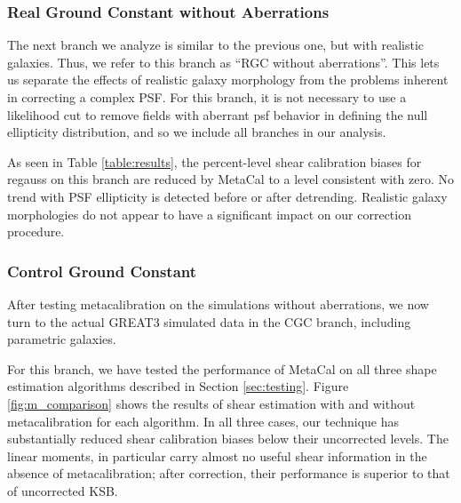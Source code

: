 \documentclass[iop]{emulateapj}
\begin{document}
\subsubsection{Real Ground Constant without Aberrations}

The next branch we analyze is similar to the previous one, but with
realistic galaxies.  Thus, we refer to this branch as ``RGC without
aberrations''. This lets us separate the effects of realistic galaxy
morphology from the problems inherent in correcting a complex PSF. For
this branch, it is not necessary to use a likelihood cut to remove
fields with aberrant psf behavior in defining the null ellipticity
distribution, and so we include all branches in our analysis.

As seen in Table \ref{table:results}, the percent-level shear
calibration biases for regauss on this branch are reduced by MetaCal
to a level consistent with zero. No trend with PSF ellipticity is
detected before or after detrending. Realistic galaxy morphologies do
not appear to have a significant impact on our correction procedure.


\subsubsection{Control Ground Constant}

After testing metacalibration on the simulations without aberrations,
we now turn to the actual GREAT3 simulated data in the CGC branch,
including parametric galaxies.

For this branch, we have tested the performance of MetaCal on all
three shape estimation algorithms described in Section
\ref{sec:testing}. Figure \ref{fig:m_comparison} shows the results of
shear estimation with and without metacalibration for each
algorithm. In all three cases, our technique has substantially reduced
shear calibration biases below their uncorrected levels. The linear
moments, in particular carry almost no useful shear information in the
absence of metacalibration; after correction, their performance is
superior to that of uncorrected KSB.
\end{document}
